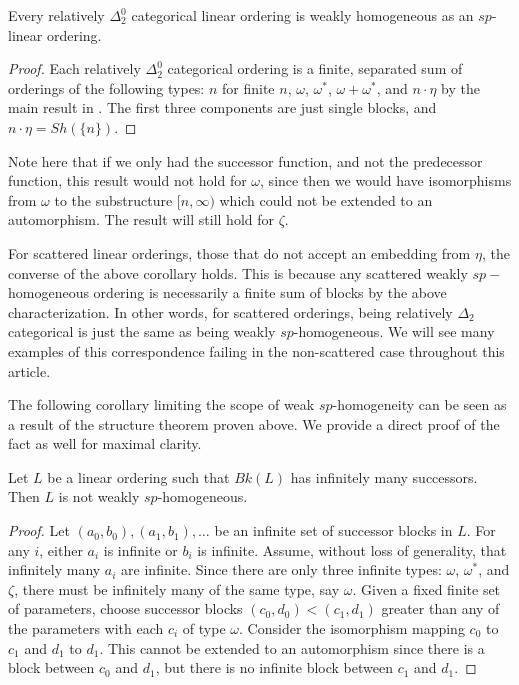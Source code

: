 \documentclass[11pt]{amsart}
\theoremstyle{definition}
\begin{document}
\begin{corollary}  Every relatively $\Delta^0_2$ categorical linear ordering is weakly homogeneous as an $sp$-linear ordering. 
\end{corollary}

\begin{proof} Each relatively $\Delta^0_2$ categorical ordering is a finite, separated sum of orderings of the following types: $n$ for finite $n$, $\omega$, $\omega^*$, $\omega+\omega^*$, and $n\cdot \eta$ by the main result in \cite{McCoy2002}. The first three components are just single blocks, and $n \cdot \eta = Sh(\{n\})$.
\end{proof}

Note here that if we only had the successor function, and not the predecessor function, this result would not hold for $\omega$, since then we would have isomorphisms from $\omega$ to the substructure $[n,\infty)$ which could not be extended to an automorphism. The result will still hold for $\zeta$. 

For scattered linear orderings, those that do not accept an embedding from $\eta$, the converse of the above corollary holds.
This is because any scattered weakly $sp-$homogeneous ordering is necessarily a finite sum of blocks by the above characterization.
In other words, for scattered orderings, being relatively $\Delta_2$ categorical is just the same as being weakly $sp$-homogeneous.
We will see many examples of this correspondence failing in the non-scattered case throughout this article.



The following corollary limiting the scope of weak $sp$-homogeneity can be seen as a result of the structure theorem proven above.
We provide a direct proof of the fact as well for maximal clarity.

\begin{corollary}\label{cor:BkHasFinSuccessors}
    Let $L$ be a linear ordering such that $Bk(L)$ has infinitely many successors. Then $L$ is not weakly $sp$-homogeneous.
\end{corollary}  


\begin{proof} Let $(a_0,b_0), (a_1,b_1), \dots$ be an infinite set of successor blocks in $L$. For any $i$,  either $a_i$ is infinite or $b_i$ is infinite.  Assume, without loss of generality, that infinitely many $a_i$ are infinite.  Since there are only three infinite types: $\omega$, $\omega^*$, and $\zeta$, there must be infinitely many of the same type, say $\omega$.  Given a fixed finite set of parameters, choose successor blocks $(c_0,d_0) < (c_1,d_1)$ greater than any of the parameters with each $c_i$ of type $\omega$. Consider the isomorphism mapping $c_0$ to $c_1$ and $d_1$ to $d_1$. 
This cannot be extended to an automorphism since there is a block between $c_0$ and $d_1$, but there is no infinite block between $c_1$ and $d_1$. 
\end{proof}
\end{document}
